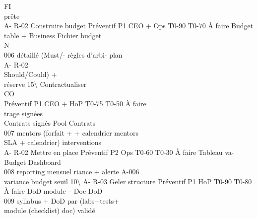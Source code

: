 \vspace{0.5em}
\vspace{0.5em}
FI\\
prête\\
A- R-02     Construire budget Préventif P1    CEO + Ops    T0-90 T0-70 À faire   Budget table + Business Fichier budget\\
\vspace{0.5em}
\vspace{0.5em}
\vspace{0.5em}
\vspace{0.5em}
N\\
006         détaillé (Must/-                                                     règles d’arbi- plan\\
\vspace{0.5em}
\vspace{0.5em}
\vspace{0.5em}
A- R-02\\
Should/Could) +\\
réserve 15\textbackslash{}%
Contractualiser\\
CO\\
Préventif P1   CEO + HoP    T0-75 T0-50 À faire\\
trage signées\\
\vspace{0.5em}
Contrats signés Pool    Contrats\\
007         mentors (forfait +                                                   + calendrier    mentors\\
SLA + calendrier)                                                    interventions\\
A- R-02     Mettre en place    Préventif P2   Ops          T0-60 T0-30 À faire   Tableau va-     Budget Dashboard\\
008         reporting mensuel                                                    riance + alerte A-006\\
variance budget                                                      seuil 10\textbackslash{}%
A- R-03     Geler structure    Préventif P1   HoP          T0-90 T0-80 À faire   DoD module      –       Doc DoD\\
009         syllabus + DoD par                                                   (labs+tests+\\
module (checklist)                                                   doc) validé\\
